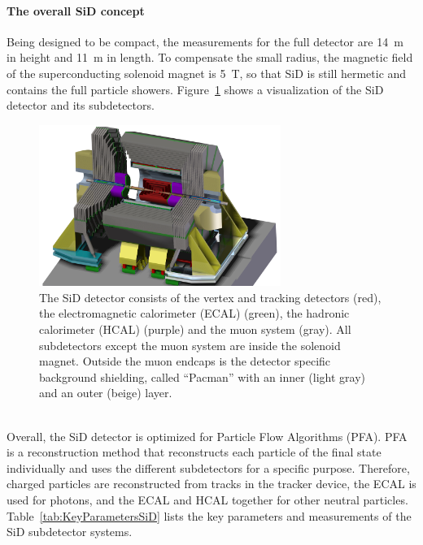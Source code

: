 \paragraph{The overall SiD concept}
Being designed to be compact, the measurements for the full detector are \SI{14}{m} in height and \SI{11}{m} in length.
To compensate the small radius, the magnetic field of the superconducting solenoid magnet is \SI{5}{T}, so that SiD is still hermetic and contains the full particle showers.
Figure~\ref{fig:SiD} shows a visualization of the SiD detector and its subdetectors.
\begin{figure}
\centering
\includegraphics[width=0.7\textwidth]{Figures/SiD_new.jpg}
\caption[Visualization of the SiD detector]{The SiD detector consists of the vertex and tracking detectors (red), the electromagnetic calorimeter (ECAL) (green), the hadronic calorimeter (HCAL) (purple) and the muon system (gray).
All subdetectors except the muon system are inside the solenoid magnet.
Outside the muon endcaps is the detector specific background shielding, called ``Pacman'' with an inner (light gray) and an outer (beige) layer.~\cite{SiD_Geo}}
\label{fig:SiD}
\end{figure}
\\
Overall, the SiD detector is optimized for Particle Flow Algorithms (PFA).
PFA is a reconstruction method that reconstructs each particle of the final state individually and uses the different subdetectors for a specific purpose.
Therefore, charged particles are reconstructed from tracks in the tracker device, the ECAL is used for photons, and the ECAL and HCAL together for other neutral particles.~\cite{PFA}
Table~\ref{tab:KeyParametersSiD} lists the key parameters and measurements of the SiD subdetector systems.\\
